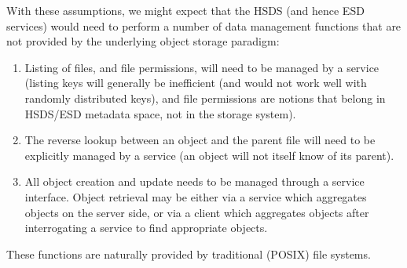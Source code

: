 With these assumptions, we might expect that the HSDS (and hence ESD services) would need to perform a number of data management functions that are not provided by the underlying object storage paradigm:
\begin{enumerate} [resume]
    \item Listing of files, and file permissions, will need to be managed by a service (listing keys will generally be inefficient (and would not work well with randomly distributed keys), and file permissions are notions that belong in HSDS/ESD metadata space, not in the storage system).
    \item The reverse lookup between an object and the parent file will need to be explicitly managed by a service (an object will not itself know of its parent).
    \item All object creation and update needs to be managed through a service interface. Object retrieval may be either via a service which aggregates objects on the server side, or via a client which aggregates objects after interrogating a service to find appropriate objects.
\end{enumerate}
These functions are naturally provided by traditional (POSIX) file systems.
